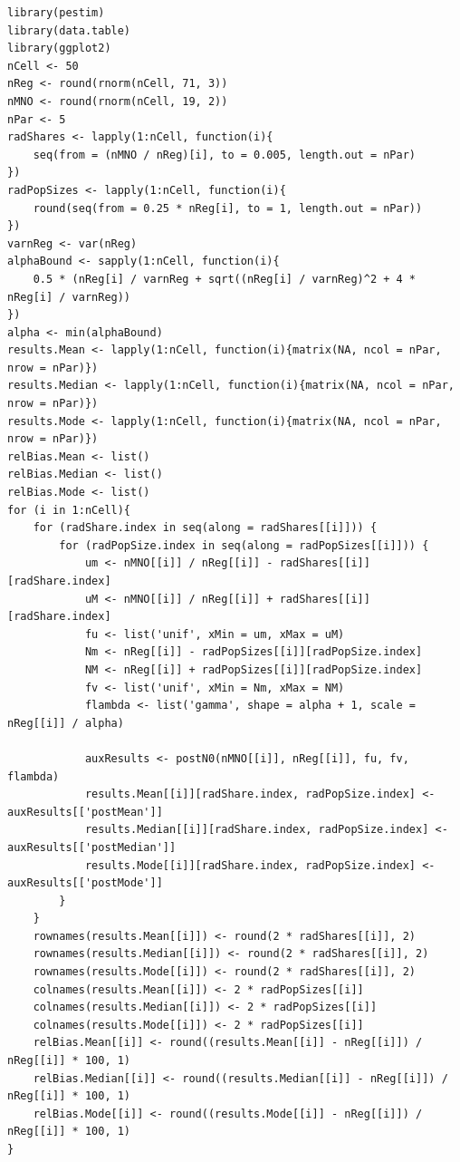 \documentclass[12pt, a4paper]{article}
\begin{document}
\begin{verbatim}
library(pestim)
library(data.table)
library(ggplot2)
nCell <- 50
nReg <- round(rnorm(nCell, 71, 3))
nMNO <- round(rnorm(nCell, 19, 2))
nPar <- 5
radShares <- lapply(1:nCell, function(i){
    seq(from = (nMNO / nReg)[i], to = 0.005, length.out = nPar)
})
radPopSizes <- lapply(1:nCell, function(i){
    round(seq(from = 0.25 * nReg[i], to = 1, length.out = nPar))
})
varnReg <- var(nReg)
alphaBound <- sapply(1:nCell, function(i){
    0.5 * (nReg[i] / varnReg + sqrt((nReg[i] / varnReg)^2 + 4 * nReg[i] / varnReg))
})
alpha <- min(alphaBound)
results.Mean <- lapply(1:nCell, function(i){matrix(NA, ncol = nPar, nrow = nPar)})
results.Median <- lapply(1:nCell, function(i){matrix(NA, ncol = nPar, nrow = nPar)})
results.Mode <- lapply(1:nCell, function(i){matrix(NA, ncol = nPar, nrow = nPar)})
relBias.Mean <- list()
relBias.Median <- list()
relBias.Mode <- list()
for (i in 1:nCell){
    for (radShare.index in seq(along = radShares[[i]])) {
        for (radPopSize.index in seq(along = radPopSizes[[i]])) {
            um <- nMNO[[i]] / nReg[[i]] - radShares[[i]][radShare.index]
            uM <- nMNO[[i]] / nReg[[i]] + radShares[[i]][radShare.index]
            fu <- list('unif', xMin = um, xMax = uM)
            Nm <- nReg[[i]] - radPopSizes[[i]][radPopSize.index]
            NM <- nReg[[i]] + radPopSizes[[i]][radPopSize.index]
            fv <- list('unif', xMin = Nm, xMax = NM)
            flambda <- list('gamma', shape = alpha + 1, scale = nReg[[i]] / alpha)

            auxResults <- postN0(nMNO[[i]], nReg[[i]], fu, fv, flambda)
            results.Mean[[i]][radShare.index, radPopSize.index] <- auxResults[['postMean']] 
            results.Median[[i]][radShare.index, radPopSize.index] <- auxResults[['postMedian']]
            results.Mode[[i]][radShare.index, radPopSize.index] <- auxResults[['postMode']]
        }
    }
    rownames(results.Mean[[i]]) <- round(2 * radShares[[i]], 2)
    rownames(results.Median[[i]]) <- round(2 * radShares[[i]], 2)
    rownames(results.Mode[[i]]) <- round(2 * radShares[[i]], 2)
    colnames(results.Mean[[i]]) <- 2 * radPopSizes[[i]]
    colnames(results.Median[[i]]) <- 2 * radPopSizes[[i]]
    colnames(results.Mode[[i]]) <- 2 * radPopSizes[[i]]
    relBias.Mean[[i]] <- round((results.Mean[[i]] - nReg[[i]]) / nReg[[i]] * 100, 1)
    relBias.Median[[i]] <- round((results.Median[[i]] - nReg[[i]]) / nReg[[i]] * 100, 1)
    relBias.Mode[[i]] <- round((results.Mode[[i]] - nReg[[i]]) / nReg[[i]] * 100, 1)
}


\end{verbatim}
\end{document}
